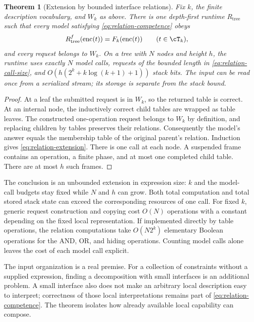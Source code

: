 \documentclass[11pt,twoside]{article}
\newcommand{\enc}{\operatorname{enc}}
\newtheorem{theorem}{Theorem}[section]
\theoremstyle{definition}
\theoremstyle{remark}
\begin{document}
\begin{theorem}[Extension by bounded interface relations]
\label{thm:relation-extension}
Fix $k$, the finite description vocabulary, and $W_k$ as above. There is
one depth-first runtime $R_{\mathrm{tree}}$ such that every model satisfying
\eqref{eq:relation-competence} obeys
\begin{equation}
 R_{\mathrm{tree}}^f(\enc(t))=F_k(\enc(t))\qquad(t\in\cT_k),
 \label{eq:relation-extension}
\end{equation}
and every request belongs to $W_k$. On a tree with $N$ nodes and height
$h$, the runtime uses exactly $N$ model calls, requests of the bounded
length in \eqref{eq:relation-call-size}, and
$O(h(2^k+k\log(k+1)+1))$ stack bits. The input can be read once from a
serialized stream; its storage is separate from the stack bound.
\end{theorem}
\begin{proof}
At a leaf the submitted request is in $W_k$, so the returned table is
correct. At an internal node, the inductively correct child tables are
wrapped as table leaves. The constructed one-operation request belongs to
$W_k$ by definition, and replacing children by tables preserves their
relations. Consequently the model's answer equals the membership table of
the original parent's relation. Induction gives \eqref{eq:relation-extension}.
There is one call at each node. A suspended frame contains an operation,
a finite phase, and at most one completed child table. There are at most
$h$ such frames.
\end{proof}

The conclusion is an unbounded extension in expression size: $k$ and the
model-call budgets stay fixed while $N$ and $h$ can grow. Both total
computation and total stored stack state can exceed the corresponding
resources of one call. For fixed $k$, generic request construction and
copying cost $O(N)$ operations with a constant depending on the fixed
local representation. If implemented directly by table operations, the
relation computations take $O(N2^k)$ elementary Boolean operations for the
AND, OR, and hiding operations. Counting model calls alone leaves the cost
of each model call explicit.

The input organization is a real premise. For a collection of constraints
without a supplied expression, finding a decomposition with small
interfaces is an additional problem. A small interface also does not make
an arbitrary local description easy to interpret; correctness of those
local interpretations remains part of \eqref{eq:relation-competence}.
The theorem isolates how already available local capability can compose.
\end{document}
